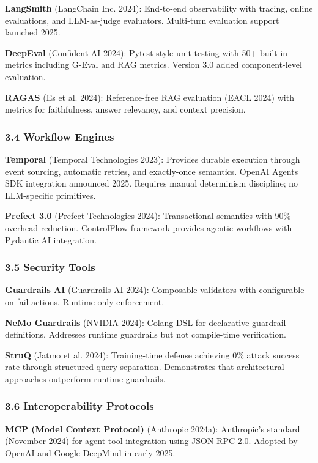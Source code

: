 \documentclass[
]{article}
\begin{document}
\textbf{LangSmith} (LangChain Inc. 2024): End-to-end observability with
tracing, online evaluations, and LLM-as-judge evaluators. Multi-turn
evaluation support launched 2025.

\textbf{DeepEval} (Confident AI 2024): Pytest-style unit testing with
50+ built-in metrics including G-Eval and RAG metrics. Version 3.0 added
component-level evaluation.

\textbf{RAGAS} (Es et al. 2024): Reference-free RAG evaluation (EACL
2024) with metrics for faithfulness, answer relevancy, and context
precision.

\subsubsection{3.4 Workflow Engines}\label{workflow-engines}

\textbf{Temporal} (Temporal Technologies 2023): Provides durable
execution through event sourcing, automatic retries, and exactly-once
semantics. OpenAI Agents SDK integration announced 2025. Requires manual
determinism discipline; no LLM-specific primitives.

\textbf{Prefect 3.0} (Prefect Technologies 2024): Transactional
semantics with 90\%+ overhead reduction. ControlFlow framework provides
agentic workflows with Pydantic AI integration.

\subsubsection{3.5 Security Tools}\label{security-tools}

\textbf{Guardrails AI} (Guardrails AI 2024): Composable validators with
configurable on-fail actions. Runtime-only enforcement.

\textbf{NeMo Guardrails} (NVIDIA 2024): Colang DSL for declarative
guardrail definitions. Addresses runtime guardrails but not compile-time
verification.

\textbf{StruQ} ({Jatmo et al.} 2024): Training-time defense achieving
0\% attack success rate through structured query separation.
Demonstrates that architectural approaches outperform runtime
guardrails.

\subsubsection{3.6 Interoperability
Protocols}\label{interoperability-protocols}

\textbf{MCP (Model Context Protocol)} (Anthropic 2024a): Anthropic's
standard (November 2024) for agent-tool integration using JSON-RPC 2.0.
Adopted by OpenAI and Google DeepMind in early 2025.
\end{document}
